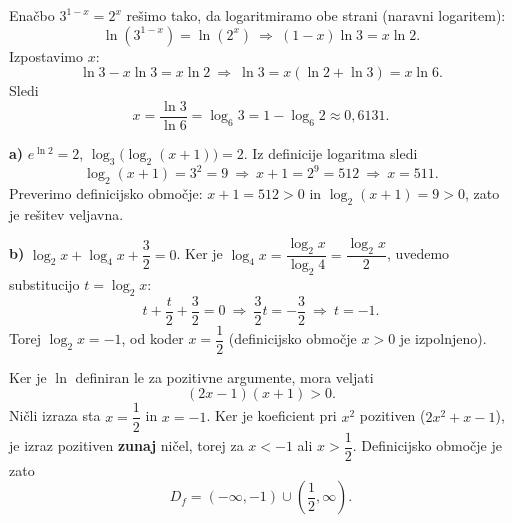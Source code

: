 \documentclass[a4paper,12pt]{letter}
\begin{document}
\begin{center}
\begin{resitev}
\begin{center}
\end{center}
\end{resitev}

\begin{resitev}
Ena\v{c}bo $3^{1-x}=2^x$ re\v{s}imo tako, da logaritmiramo obe strani (naravni logaritem):
\[
\ln\!\left(3^{1-x}\right)=\ln\!\left(2^{x}\right)\ \Longrightarrow\ (1-x)\ln3=x\ln2.
\]
Izpostavimo $x$:
\[
\ln3-x\ln3=x\ln2\ \Longrightarrow\ \ln3=x(\ln2+\ln3)=x\ln6.
\]
Sledi
\[
x=\frac{\ln3}{\ln6}=\log_6 3=1-\log_6 2\approx0{,}6131.
\]
\end{resitev}

\begin{resitev}
\textbf{a)} $e^{\ln 2} = 2$, $\log_3\big(\log_2(x+1)\big)=2$. Iz definicije logaritma sledi
\[
\log_2(x+1)=3^2=9\ \Longrightarrow\ x+1=2^9=512\ \Longrightarrow\ x=511.
\]
Preverimo definicijsko obmo\v{c}je: $x+1=512>0$ in $\log_2(x+1)=9>0$, zato je re\v{s}itev veljavna.

\textbf{b)} $\log_2 x+\log_4 x+\dfrac32=0$. Ker je $\log_4 x=\dfrac{\log_2 x}{\log_2 4}=\dfrac{\log_2 x}{2}$, uvedemo substitucijo $t=\log_2 x$:
\[
t+\frac t2+\frac32=0\ \Longrightarrow\ \frac32t=-\frac32\ \Longrightarrow\ t=-1.
\]
Torej $\log_2 x=-1$, od koder $x=\dfrac12$ (definicijsko obmo\v{c}je $x>0$ je izpolnjeno).
\end{resitev}

\newpage
\begin{resitev}
Ker je $\ln$ definiran le za pozitivne argumente, mora veljati
\[
(2x-1)(x+1)>0.
\]
Ni\v{c}li izraza sta $x=\dfrac12$ in $x=-1$. Ker je koeficient pri $x^2$ pozitiven ($2x^2+x-1$), je izraz pozitiven \textbf{zunaj} ni\v{c}el, torej za $x<-1$ ali $x>\dfrac12$. Definicijsko obmo\v{c}je je zato
\[
D_f=(-\infty,-1)\cup\left(\frac12,\infty\right).
\]
\end{resitev}


\end{center}
\end{document}
